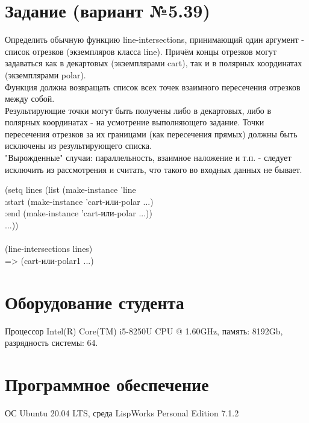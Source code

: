 \documentclass[12pt]{article}
\begin{document}
\section{Задание (вариант №5.39)}
{\large 
Определить обычную функцию line-intersections, принимающий один аргумент - список отрезков 
(экземпляров класса line). Причём концы отрезков могут задаваться как в 
декартовых (экземплярами cart), так и в полярных координатах (экземплярами polar).
\\
Функция должна возвращать список всех точек взаимного пересечения отрезков между собой.
\\
Результирующие точки могут быть получены либо в декартовых, либо в полярных 
координатах - на усмотрение выполняющего задание. Точки пересечения отрезков 
за их границами (как пересечения прямых) должны быть исключены из результирующего списка.
\\
"Вырожденные" случаи: параллельность, взаимное наложение и т.п. - следует исключить 
из рассмотрения и считать, что такого во входных данных не бывает.

(setq lines (list (make-instance 'line \\
                   :start (make-instance 'cart-или-polar ...) \\
                   :end (make-instance 'cart-или-polar ...)) \\
                  ...)) \\
\\
(line-intersections lines) \\
=> (cart-или-polar1 ...) \\
}

\section{Оборудование студента}
{\large Процессор Intel(R) Core(TM) i5-8250U CPU @ 1.60GHz, память: 8192Gb, разрядность системы: 64.}

\section{Программное обеспечение}
{\large ОС Ubuntu 20.04 LTS, среда LispWorks Personal Edition 7.1.2}
\end{document}
